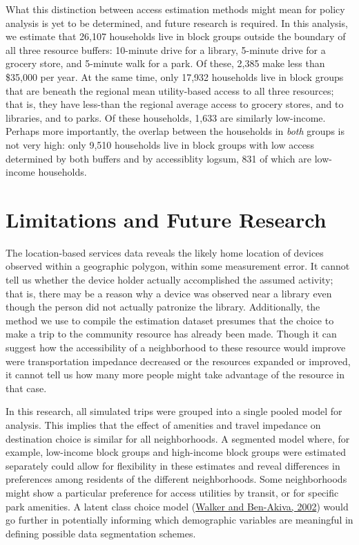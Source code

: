 \documentclass[3p, authoryear, review]{elsarticle} %
\begin{document}
What this distinction between access estimation methods might mean for policy
analysis is yet to be determined, and future research is required. In this analysis,
we estimate that 26,107 households live in block groups outside the
boundary of all three resource buffers: 10-minute drive for a library, 5-minute drive for
a grocery store, and 5-minute walk for a park. Of these, 2,385 make less
than \$35,000 per year.
At the same time, only 17,932 households
live in block groups that are beneath the regional mean utility-based access to
all three resources; that is, they have less-than the regional average access to
grocery stores, and to libraries, and to parks. Of these households, 1,633
are similarly low-income. Perhaps more importantly, the overlap between the households
in \emph{both} groups is not very high: only 9,510 households live
in block groups with low access determined by both buffers and by accessiblity
logsum, 831 of which are low-income households.

\hypertarget{limitations-and-future-research}{%
\section{Limitations and Future Research}\label{limitations-and-future-research}}

The location-based services data reveals the likely home location of devices
observed within a geographic polygon, within some measurement error.
It cannot tell us whether the device holder actually accomplished the assumed
activity; that is, there may be a reason why a device was observed near a
library even though the person did not actually patronize the library.
Additionally, the method we use to compile the estimation dataset presumes that
the choice to make a trip to the community resource has already been made. Though
it can suggest how the accessibility of a neighborhood to these resource would improve
were transportation impedance decreased or the resources expanded or improved,
it cannot tell us how many more people might take advantage of the resource
in that case.

In this research, all simulated trips were grouped into a single pooled model
for analysis. This implies that the effect of amenities and travel impedance on
destination choice is similar for all neighborhoods. A segmented model
where, for example, low-income block groups and high-income block groups were
estimated separately could allow for flexibility in these estimates and reveal
differences in preferences among residents of the different neighborhoods. Some
neighborhoods might show a particular preference for access utilities by
transit, or for specific park amenities. A latent class choice model (\protect\hyperlink{ref-walker2002}{Walker and Ben-Akiva, 2002})
would go further in potentially informing which demographic variables are
meaningful in defining possible data segmentation schemes.
\end{document}
